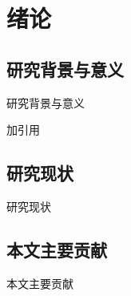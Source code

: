 \chapter{绪论}
\label{ch:structure}

\section{研究背景与意义}

研究背景与意义

加引用\cite{hinton2012deep}

\section{研究现状}

研究现状

\section{本文主要贡献}

本文主要贡献